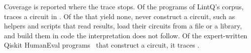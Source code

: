Coverage is reported where the trace stops. Of the \numScaleSOneFiles{} programs of LintQ's corpus, \tool{} traces
a circuit in \numScaleSOneSliced{}. Of the \numCovNoCircuit{} that yield none, \numCovNoConstruction{} never
construct a circuit, such as helpers and scripts that read results, \numCovFromFile{} load their circuits from a
file or a library, and \numCovOther{} build them in code the interpretation does not follow. Of the
\numQheBuilds{} expert-written Qiskit HumanEval programs~\cite{vishwakarma2024qhe} that construct a circuit, it
traces \numQheTracedOfBuildsPct{}.
